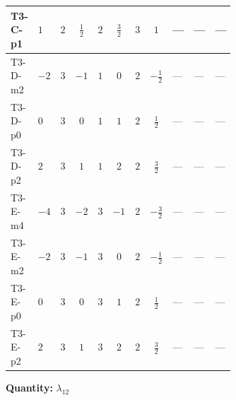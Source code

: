 \documentclass[8pt]{article}
\begin{document}
\begin{landscape}
\begin{longtable}{@{}llcccccc >{\raggedright\arraybackslash}p{0.21\linewidth} >{\raggedright\arraybackslash}p{0.21\linewidth} >{\raggedright\arraybackslash}p{0.21\linewidth}@{}}
\midrule
T3-C-p1 & $1$ & $2$ & $\frac{1}{2}$ & $2$ & $\frac{3}{2}$ & $3$ & $1$ & --- & --- & --- \\
\midrule
T3-D-m2 & $-2$ & $3$ & $-1$ & $1$ & $0$ & $2$ & $-\frac{1}{2}$ & --- & --- & --- \\
\midrule
T3-D-p0 & $0$ & $3$ & $0$ & $1$ & $1$ & $2$ & $\frac{1}{2}$ & --- & --- & --- \\
\midrule
T3-D-p2 & $2$ & $3$ & $1$ & $1$ & $2$ & $2$ & $\frac{3}{2}$ & --- & --- & --- \\
\midrule
T3-E-m4 & $-4$ & $3$ & $-2$ & $3$ & $-1$ & $2$ & $-\frac{3}{2}$ & --- & --- & --- \\
\midrule
T3-E-m2 & $-2$ & $3$ & $-1$ & $3$ & $0$ & $2$ & $-\frac{1}{2}$ & --- & --- & --- \\
\midrule
T3-E-p0 & $0$ & $3$ & $0$ & $3$ & $1$ & $2$ & $\frac{1}{2}$ & --- & --- & --- \\
\midrule
T3-E-p2 & $2$ & $3$ & $1$ & $3$ & $2$ & $2$ & $\frac{3}{2}$ & --- & --- & --- \\
\midrule
\bottomrule
\end{longtable}
\clearpage
\noindent\textbf{Quantity: }$\lambda_{12}$\par\smallskip

\end{landscape}
\end{document}
